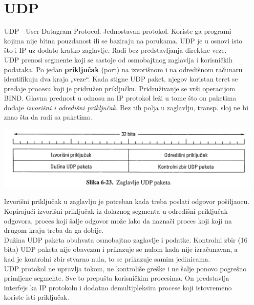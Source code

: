 \documentclass{article} %
\begin{document}
\section{UDP}
UDP - User Datagram Protocol. Jednostavan protokol. Koriste ga programi kojima nije bitna pouzdanost ili se baziraju na porukama. UDP je u osnovi isto što i IP uz dodato kratko zaglavlje.  Radi bez predstavljanja direktne veze. \\

UDP prenosi segmente koji se sastoje od osmobajtnog zaglavlja i korisničkih podataka. Po jedan \textbf{priključak }(port) na izvorišnom i na odredišnom računaru identifikuju dva kraja „veze“. Kada stigne UDP paket, njegov koristan teret se predaje procesu koji je pridružen priključku. Pridruživanje se vrši operacijom BIND. Glavna prednost u odnosu na IP protokol leži u tome što on paketima dodaje \textit{izvorišni i odredišni priključak}. Bez tih polja u zaglavlju, transp. sloj ne bi znao šta da radi sa paketima. 
\begin{center}
	\includegraphics[scale=0.7]{udp}
\end{center}
Izvorišni priključak u zaglavlju je potreban kada treba poslati odgovor pošiljaocu. Kopirajući izvorišni priključak iz dolaznog segmenta u odredišni priključak odgovora, proces koji šalje odgovor može lako da naznači proces koji koji na drugom kraju treba da ga dobije.\\
Dužina UDP paketa obuhvata osmobajtno zaglavlje i podatke. Kontrolni zbir (16 bita) UDP paketa nije obavezan i prikazuje se nulom kada nije izračunavan, a kad je kontrolni zbir stvarno nula, to se prikazuje samim jedinicama. 
\\

UDP protokol ne upravlja tokom, ne kontroliše greške i ne šalje ponovo pogrešno primljene segmente. Sve to prepušta korisničkim procesima. On predstavlja interfejs ka IP protokolu i dodatno demultipleksira procese koji istovremeno koriste isti priključak. \\\\
\end{document}
